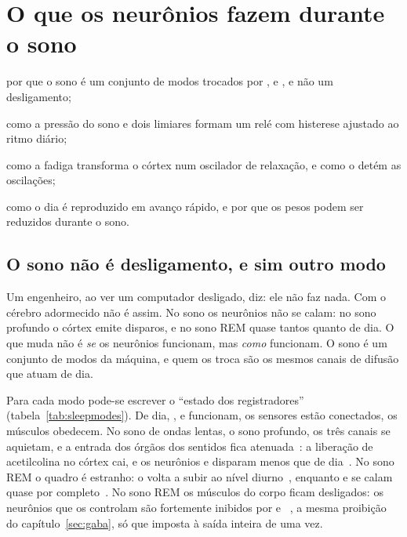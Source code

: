 \chapter{O que os neurônios fazem durante o sono}
\label{sec:sleep}
\begin{chaptergoals}
\item por que o sono é um conjunto de modos trocados por ,  e , e não um desligamento;
\item como a pressão do sono e dois limiares formam um relé com histerese ajustado ao ritmo diário;
\item como a fadiga transforma o córtex num oscilador de relaxação, e como o  detém as oscilações;
\item como o dia é reproduzido em avanço rápido, e por que os pesos podem ser reduzidos durante o sono.
\end{chaptergoals}

\section{O sono não é desligamento, e sim outro modo}

Um engenheiro, ao ver um computador desligado, diz: ele não faz nada. Com o cérebro adormecido não é assim. No sono os neurônios não se calam: no sono profundo o córtex emite disparos, e no sono REM quase tantos quanto de dia. O que muda não é \emph{se} os neurônios funcionam, mas \emph{como} funcionam. O sono é um conjunto de modos da máquina, e quem os troca são os mesmos canais de difusão que atuam de dia.

Para cada modo pode-se escrever o ``estado dos registradores'' (tabela~\ref{tab:sleepmodes}). De dia, ,  e  funcionam, os sensores estão conectados, os músculos obedecem. No sono de ondas lentas, o sono profundo, os três canais se aquietam, e a entrada dos órgãos dos sentidos fica atenuada~\cite{Hasselmo1999}: a liberação de acetilcolina no córtex cai, e os neurônios  e  disparam menos que de dia~\cite{Marrosu1995,AstonJonesBloom1981,McGintyHarper1976}. No sono REM o quadro é estranho: o  volta a subir ao nível diurno~\cite{Marrosu1995}, enquanto  e  se calam quase por completo~\cite{AstonJonesBloom1981,McGintyHarper1976,JacobsAzmitia1992}. No sono REM os músculos do corpo ficam desligados: os neurônios  que os controlam são fortemente inibidos por  e ~\cite{BrooksPeever2012}, a mesma proibição do capítulo~\ref{sec:gaba}, só que imposta à saída inteira de uma vez.

